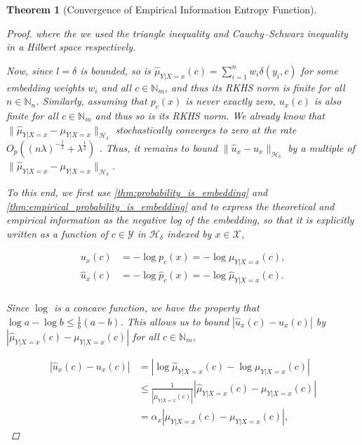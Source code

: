 \documentclass{article}
\newtheorem{theorem}{Theorem}[section]
\begin{document}
\begin{theorem}[Convergence of Empirical Information Entropy Function]
\begin{proof}
			where the we used the triangle inequality and Cauchy–Schwarz inequality in a Hilbert space respectively.
			
			Now, since $l = \delta$ is bounded, so is $\hat{\mu}_{Y | X = x}(c) = \sum_{i = 1}^{n} w_{i} \delta(y_{i}, c)$ for some embedding weights $w_{i}$ and all $c \in \mathbb{N}_{m}$, and thus its RKHS norm is finite for all $n \in \mathbb{N}_{n}$. Similarly, assuming that $p_{c}(x)$ is never exactly zero, $u_{x}(c)$ is also finite for all $c \in \mathbb{N}_{m}$ and thus so is its RKHS norm. We already know that $\| \hat{\mu}_{Y | X = x} - \mu_{Y | X = x} \|_{\mathcal{H}_{\delta}}$ stochastically converges to zero at the rate $O_{p}((n \lambda)^{-\frac{1}{2}} + \lambda^{\frac{1}{2}})$ \citep{song2009hilbert}. Thus, it remains to bound $\| \hat{u}_{x} - u_{x} \|_{\mathcal{H}_{\delta}}$ by a multiple of $\| \hat{\mu}_{Y | X = x} - \mu_{Y | X = x} \|_{\mathcal{H}_{\delta}}$.
			
			To this end, we first use \cref{thm:probability_is_embedding} and \cref{thm:empirical_probability_is_embedding} and to express the theoretical and empirical information as the negative log of the embedding, so that it is explicitly written as a function of $c \in \mathcal{Y}$ in $\mathcal{H}_{\delta}$ indexed by $x \in \mathcal{X}$,
			
			\begin{equation}
			\begin{aligned}
				u_{x}(c) &= - \log{p_{c}(x)} = -\log{\mu_{Y | X = x}(c)}, \\
				\hat{u}_{x}(c) &= - \log{\hat{p}_{c}(x)} = -\log{\hat{\mu}_{Y | X = x}(c)}. \\
			\end{aligned}
			\end{equation}
			
			Since $\log$ is a concave function, we have the property that $\log{a} - \log{b} \leq \frac{1}{b} (a - b)$. This allows us to bound $| \hat{u}_{x}(c) - u_{x}(c) |$ by $| \hat{\mu}_{Y | X = x}(c) - \mu_{Y | X = x}(c) |$ for all $c \in \mathbb{N}_{m}$,
			
			\begin{equation}
			\begin{aligned}
				| \hat{u}_{x}(c) - u_{x}(c) | &= | \log{\hat{\mu}_{Y | X = x}(c)} - \log{\mu_{Y | X = x}(c)} | \\
				&\leq \frac{1}{| \mu_{Y | X = x}(c) |} | \hat{\mu}_{Y | X = x}(c) - \mu_{Y | X = x}(c) | \\
				&= \alpha_{x} | \hat{\mu}_{Y | X = x}(c) - \mu_{Y | X = x}(c) |,
			\end{aligned}
			\end{equation}
			

\end{proof}
\end{theorem}
\end{document}
